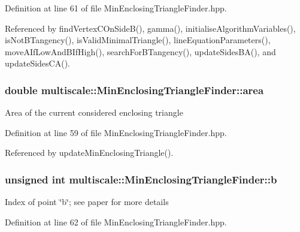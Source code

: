 Definition at line 61 of file Min\-Enclosing\-Triangle\-Finder.\-hpp.



Referenced by find\-Vertex\-C\-On\-Side\-B(), gamma(), initialise\-Algorithm\-Variables(), is\-Not\-B\-Tangency(), is\-Valid\-Minimal\-Triangle(), line\-Equation\-Parameters(), move\-A\-If\-Low\-And\-B\-If\-High(), search\-For\-B\-Tangency(), update\-Sides\-B\-A(), and update\-Sides\-C\-A().

\hypertarget{classmultiscale_1_1MinEnclosingTriangleFinder_a64ea18728dc70fd6235961c12802123a}{
\subsubsection[{area}]{\setlength{\rightskip}{0pt plus 5cm}double multiscale\-::\-Min\-Enclosing\-Triangle\-Finder\-::area\hspace{0.3cm}{\ttfamily [private]}}}\label{classmultiscale_1_1MinEnclosingTriangleFinder_a64ea18728dc70fd6235961c12802123a}
Area of the current considered enclosing triangle 

Definition at line 59 of file Min\-Enclosing\-Triangle\-Finder.\-hpp.



Referenced by update\-Min\-Enclosing\-Triangle().

\hypertarget{classmultiscale_1_1MinEnclosingTriangleFinder_a71355f44126b38a4fb55c0c92ab64816}{
\subsubsection[{b}]{\setlength{\rightskip}{0pt plus 5cm}unsigned int multiscale\-::\-Min\-Enclosing\-Triangle\-Finder\-::b\hspace{0.3cm}{\ttfamily [private]}}}\label{classmultiscale_1_1MinEnclosingTriangleFinder_a71355f44126b38a4fb55c0c92ab64816}
Index of point \char`\"{}b\char`\"{}; see paper for more details 

Definition at line 62 of file Min\-Enclosing\-Triangle\-Finder.\-hpp.



